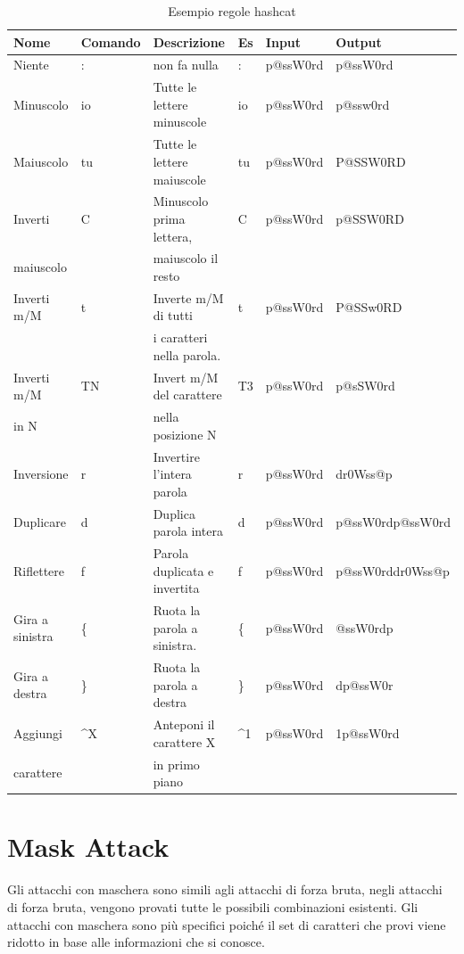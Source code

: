 \begin{table}[htbp]
    \begin{center}
    \begin{tabular}{|l|l|l|l|l|l|}
    \hline
    Nome & Comando & Descrizione & Es & Input & Output \\
    \hline
    Niente & : & non fa nulla & : & p@ssW0rd & p@ssW0rd\\
    \hline
    Minuscolo & io & Tutte le lettere minuscole	 & io & p@ssW0rd & p@ssw0rd	 \\
    \hline
    Maiuscolo & tu & Tutte le lettere maiuscole & tu & p@ssW0rd & P@SSW0RD\\
    \hline
    Inverti & C & Minuscolo prima lettera,& C & p@ssW0rd & p@SSW0RD \\
    maiuscolo&  &  maiuscolo il resto &  &  &  \\
    \hline
    Inverti m/M & t & Inverte m/M di tutti & t & p@ssW0rd & P@SSw0RD\\
    &  & i caratteri nella parola. &  &  &  \\
    \hline
    Inverti m/M& TN & Invert m/M del carattere& T3 & p@ssW0rd & p@sSW0rd\\
    in N &  &  nella posizione N &  &  &  \\
    \hline
    Inversione & r & Invertire l'intera parola & r & p@ssW0rd & dr0Wss@p\\
    \hline
    Duplicare & d & Duplica parola intera & d & p@ssW0rd & p@ssW0rdp@ssW0rd\\
    \hline
    Riflettere & f & Parola duplicata e invertita & f & p@ssW0rd & p@ssW0rddr0Wss@p \\
    \hline
    Gira a sinistra & \{ & Ruota la parola a sinistra. & \{ & p@ssW0rd & @ssW0rdp\\
    \hline
    Gira a destra & \} & Ruota la parola a destra & \} & p@ssW0rd & dp@ssW0r \\
    \hline
    Aggiungi & \textasciicircum X & Anteponi il carattere X  & \textasciicircum 1 & p@ssW0rd & 1p@ssW0rd\\
    carattere&  & in primo piano &  &  &  \\
    \hline

    \end{tabular}
    \end{center}
    \caption{Esempio regole hashcat}
    \label{tab:browser}
    \end{table}

\section{Mask Attack}
Gli attacchi con maschera \cite{Mask_attack} sono simili agli attacchi di forza bruta, negli attacchi di forza bruta, vengono provati tutte le possibili combinazioni esistenti. Gli attacchi con maschera sono più specifici poiché il set di caratteri che provi viene ridotto in base alle informazioni che si conosce.

